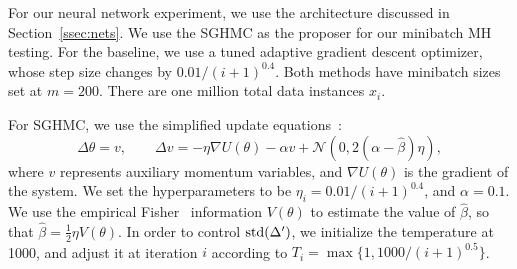 \documentclass{article}
\begin{document}
For our neural network experiment, we use the architecture discussed in Section~\ref{ssec:nets}. We
use the SGHMC as the proposer for our minibatch MH testing. For the baseline, we use a tuned
adaptive gradient descent optimizer, whose step size changes by $0.01 /(i+1)^{0.4}$. Both methods
have minibatch sizes set at $m=200$. There are one million total data instances $x_i$.

For SGHMC, we use the simplified update equations~\cite{sghmc_2014}:
\begin{equation}
\Delta \theta = v, \quad \quad\Delta v = -\eta \nabla U(\theta) - \alpha v + \mathcal{N}(0, 2(\alpha
-\hat{\beta}) \eta),
\end{equation}
where $v$ represents auxiliary momentum variables, and $\nabla U(\theta)$ is the gradient of the
system. We set the hyperparameters to be $\eta_i = 0.01 /(i+1)^{0.4}$, and $\alpha=0.1$. We use the
empirical Fisher~\cite{conf/icml/AhnBW12} information $V(\theta)$ to estimate the value of
$\hat{\beta}$, so that $\hat{\beta}=\frac{1}{2}\eta V(\theta)$. In order to control ${\rm
std}(\Delta')$, we initialize the temperature at 1000, and adjust it at iteration $i$ according to
$T_i = \max\{1, 1000/(i+1)^{0.5}\}$.

\fi



\end{document}
